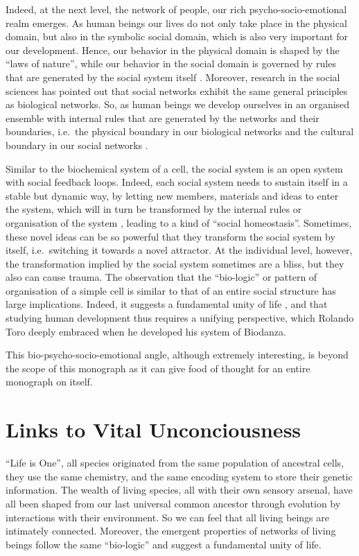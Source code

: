 \documentclass[
  11pt,
]{book}
\begin{document}
Indeed, at the next level, the network of people, our rich psycho-socio-emotional realm emerges. As human beings our lives do not only take place in the physical domain, but also in the symbolic social domain, which is also very important for our development. Hence, our behavior in the physical domain is shaped by the ``laws of nature'', while our behavior in the social domain is governed by rules that are generated by the social system itself \citep{capraLuisi2014}. Moreover, research in the social sciences has pointed out that social networks exhibit the same general principles as biological networks. So, as human beings we develop ourselves in an organised ensemble with internal rules that are generated by the networks and their boundaries, i.e.~the physical boundary in our biological networks and the cultural boundary in our social networks \citep{capraLuisi2014}.

Similar to the biochemical system of a cell, the social system is an open system with social feedback loops. Indeed, each social system needs to sustain itself in a stable but dynamic way, by letting new members, materials and ideas to enter the system, which will in turn be transformed by the internal rules or organisation of the system \citep{capraLuisi2014}, leading to a kind of ``social homeostasis''. Sometimes, these novel ideas can be so powerful that they transform the social system by itself, i.e.~switching it towards a novel attractor. At the individual level, however, the transformation implied by the social system sometimes are a bliss, but they also can cause trauma. The observation that the ``bio-logic'' or pattern of organisation of a simple cell is similar to that of an entire social structure has large implications. Indeed, it suggests a fundamental unity of life \citep{capraLuisi2014}, and that studying human development thus requires a unifying perspective, which Rolando Toro deeply embraced when he developed his system of Biodanza.

This bio-psycho-socio-emotional angle, although extremely interesting, is beyond the scope of this monograph as it can give food of thought for an entire monograph on itself.

\hypertarget{links-to-vital-unconciousness}{%
\section{Links to Vital Unconciousness}\label{links-to-vital-unconciousness}}

``Life is One'', all species originated from the same population of ancestral cells, they use the same chemistry, and the same encoding system to store their genetic information.
The wealth of living species, all with their own sensory arsenal, have all been shaped from our last universal common ancestor through evolution by interactions with their environment.
So we can feel that all living beings are intimately connected. Moreover, the emergent properties of networks of living beings follow the same ``bio-logic'' and suggest a fundamental unity of life.
\end{document}
